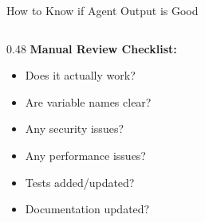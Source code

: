 \documentclass[aspectratio=169,11pt]{beamer}
\begin{document}
\begin{frame}[fragile]{How to Know if Agent Output is Good}
\begin{columns}[T]
\begin{column}{0.48\textwidth}
            \textbf{Manual Review Checklist:}
            \begin{itemize}
                \item[$\square$] Does it actually work?
                \item[$\square$] Are variable names clear?
                \item[$\square$] Any security issues?
                \item[$\square$] Any performance issues?
                \item[$\square$] Tests added/updated?
                \item[$\square$] Documentation updated?
            \end{itemize}
        \end{column}
    \end{columns}
\end{frame}
\end{document}
